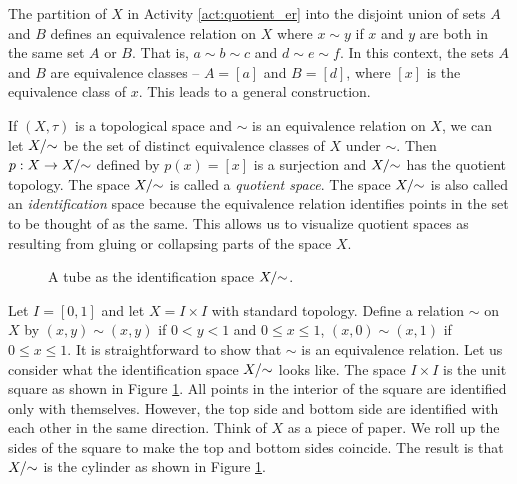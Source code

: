 \begin{comment}

\ActivitySolution Since $X^{*} = \{A,B\}$, there are only limited possibilities for open sets. We consider each in turn: 
\begin{align*}
p^{-1}(\emptyset) &= \emptyset \\
p^{-1}(\{A\}) &= \{a,b,c\} \\
p^{-1}(\{B\}) &= \{d,e,f\} \\
p^{-1}(X^{*}) &= X.
\end{align*}
From this list we see that the quotient topology on $X^{*}$ is $\{\emptyset, \{A\}, X^{*}\}$. 

\end{comment}

The partition of $X$ in Activity \ref{act:quotient_er} into the disjoint union of sets $A$ and $B$ defines an equivalence relation on $X$ where $x \sim y$ if $x$ and $y$ are both in the same set $A$ or $B$. That is, $a \sim b \sim c$ and $d \sim e \sim f$. In this context, the sets $A$ and $B$ are equivalence classes -- $A = [a]$ and $B = [d]$, where $[x]$ is the equivalence class of $x$. This leads to a general construction.

If $(X, \tau)$ is a topological space and $\sim$ is an equivalence relation on $X$, we can let $X/\hspace{-1mm}\sim$ be the set of distinct equivalence classes of $X$ under $\sim$. Then $p: X \to X/\hspace{-1mm}\sim$ defined by $p(x) = [x]$ is a surjection and $X/\hspace{-1mm}\sim$ has the quotient topology. The space $X/\hspace{-1mm}\sim$ is called a \emph{quotient space}. The space $X/\hspace{-1mm}\sim$ is also called an \emph{identification} space because the equivalence relation identifies points in the set to be thought of as the same. This allows us to visualize quotient spaces as resulting from gluing or collapsing parts of the space $X$.

\begin{figure}[h]
\begin{center}
\caption{A tube as the identification space $X/\hspace{-1mm}\sim$.} 
\label{F:Quotient_tube}
\end{center}
\end{figure}

\begin{example} Let $I = [0,1]$ and let $X = I \times I$ with standard topology. Define a relation $\sim$ on $X$ by $(x,y) \sim (x,y)$ if $0 < y < 1$ and $0 \leq x \leq 1$, $(x,0) \sim (x,1)$ if $0 \leq x \leq 1$. It is straightforward to show that $\sim$ is an equivalence relation. Let us consider what the identification space $X/\hspace{-1mm}\sim$ looks like. The space $I \times I$ is the unit square as shown in Figure \ref{F:Quotient_tube}. All points in the interior of the square are identified only with themselves. However, the top side and bottom side are identified with each other in the same direction. Think of $X$ as a piece of paper. We roll up the sides of the square to make the top and bottom sides coincide. The result is that $X/\hspace{-1mm}\sim$ is the cylinder as shown in Figure \ref{F:Quotient_tube}. 

\end{example}

